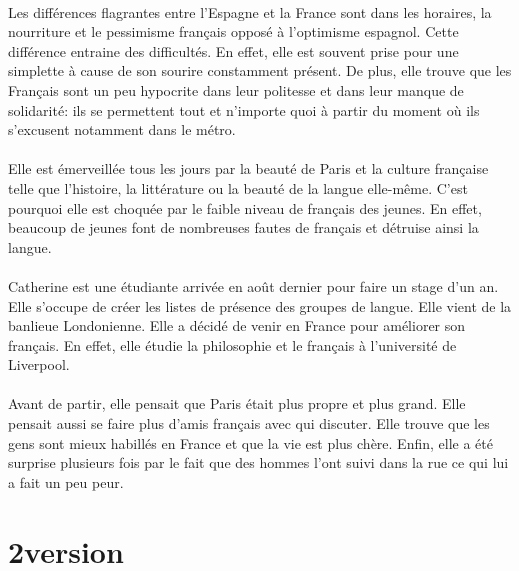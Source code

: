 \paragraph{} Les différences flagrantes entre l'Espagne et la France sont dans
les horaires, la nourriture et le pessimisme français opposé à l'optimisme
espagnol. Cette différence entraine des difficultés. En effet, elle est souvent
prise pour une simplette à cause de son sourire constamment présent. De plus,
elle trouve que les Français sont un peu hypocrite dans leur politesse et dans
leur manque de solidarité: ils se permettent tout et n'importe quoi à partir du
moment où ils s'excusent notamment dans le métro.

\paragraph{} Elle est émerveillée tous les jours par la beauté de Paris et la
culture française telle que l'histoire, la littérature ou la beauté de la
langue elle-même. C'est pourquoi elle est choquée par le faible niveau de
français des jeunes. En effet, beaucoup de jeunes font de nombreuses fautes de
français et détruise ainsi la langue.

\paragraph{} Catherine est une étudiante arrivée en août dernier pour faire un
stage d'un an. Elle s'occupe de créer les listes de présence des groupes de
langue. Elle vient de la banlieue Londonienne. Elle a décidé de venir en
France pour améliorer son français. En effet, elle étudie la philosophie et le
français à l'université de Liverpool.

\paragraph{} Avant de partir, elle pensait que Paris était plus propre et plus
grand. Elle pensait aussi se faire plus d'amis français avec qui discuter.
Elle trouve que les gens sont mieux habillés en France et que la vie est plus
chère. Enfin,  elle a été surprise plusieurs fois par le fait que des hommes
l'ont suivi dans la rue ce qui lui a fait un peu peur.


\section{2\ieme version}

